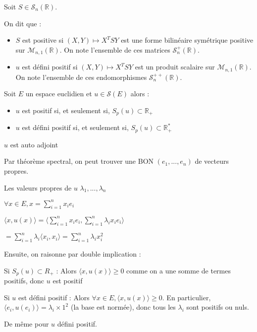 \documentclass[a4paper,12pt]{book}
\newcommand{\Def}[2]{\begin{tcolorbox}[sharp corners, colback=white,colframe=blue!90!black!75, title=Définition : #1]#2\end{tcolorbox}}
\newcommand{\Thr}[2]{\begin{tcolorbox}[sharp corners, colback=white,colframe=red!90!black!75, title=Théorème : #1]#2\end{tcolorbox}}
\newcommand{\Pre}[1]{\begin{tcolorbox}[sharp corners, colback=white,colframe=green!60!green!30!black!75, title=Preuve]#1\end{tcolorbox}}
\def\R{\mathbb{R}}
\begin{document}
\Def{}{Soit $S\in\mathcal{S}_n(\R)$.
\par On dit que :\begin{itemize}
\item $S$ est positive si $(X,Y)\mapsto X^T SY$ est une forme bilinéaire symétrique positive sur $\mathcal{M}_{n,1}(\R)$. On note l'ensemble de ces matrices $\mathcal{S}_n^+(\R)$.
\item $u$ est défini positif si $(X,Y)\mapsto X^TSY$ est un produit scalaire sur $\mathcal{M}_{n,1}(\R)$. On note l'ensemble de ces endomorphismes $\mathcal{S}_n^{++}(\R)$.
\end{itemize}}
\Thr{}{Soit $E$ un espace euclidien et $u\in\mathcal{S}(E)$ alors :\begin{itemize}
\item $u$ est positif si, et seulement si, $S_p(u)\subset\R_+$
\item $u$ est défini positif si, et seulement si, $S_p(u)\subset\R_+^*$
\end{itemize}}
\Pre{$u$ est auto adjoint
\par Par théorème spectral, on peut trouver une BON $(e_1,..., e_n)$ de vecteurs propres.
\par Les valeurs propres de $u$ $\lambda_1,...,\lambda_n$
\par $\forall x\in E, x=\sum\limits_{i=1}^nx_ie_i$
\par $\langle x, u(x)\rangle  = \langle \sum\limits_{i=1}^n x_ie_i, \sum\limits_{i=1}^n\lambda_ix_ie_i\rangle$
\par $=\sum\limits_{i=1}^n\lambda_i\langle x_i, x_i\rangle=\sum\limits_{i=1}^n\lambda_ix_i^2$
\par Ensuite, on raisonne par double implication :
\par Si $S_p(u)\subset R_+$ : Alors $\langle x, u(x)\rangle\geq 0$ comme on a une somme de termes positifs, donc $u$ est positif
\par Si $u$ est défini positif : Alors $\forall x\in E, \langle x, u(x)\rangle\geq 0$. En particulier, $\langle e_i, u(e_i)\rangle = \lambda_i \times 1^2$ (la base est normée), donc tous les $\lambda_i$ sont positifs ou nuls.
\par De même pour $u$ défini positif.}
\end{document}
